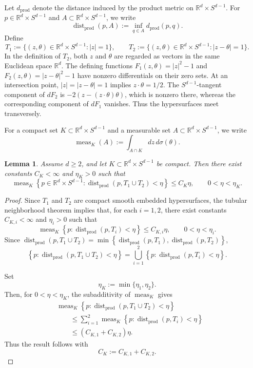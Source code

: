 \documentclass[11pt]{article}
\newtheorem{lemma}[theorem]{Lemma}
\theoremstyle{remark}
\numberwithin{equation}{section}
\begin{document}
Let $d_{\mathrm{prod}}$ denote the distance induced by the product metric on $\mathbb R^d\times S^{d-1}$. For $p\in\mathbb R^d\times S^{d-1}$ and $A\subset\mathbb R^d\times S^{d-1}$, we write 
\[ \operatorname{dist}_{\mathrm{prod}}(p,A) := \inf_{q\in A}d_{\mathrm{prod}}(p,q). \]
Define
\[ T_1 := \{(z,\theta)\in\mathbb R^d\times S^{d-1}:|z|=1\}, \qquad T_2 := \{(z,\theta)\in\mathbb R^d\times S^{d-1}:|z-\theta|=1\}. \]
In the definition of $T_2$, both $z$ and $\theta$ are regarded
as vectors in the same Euclidean space $\mathbb R^d$.
The defining functions
$F_1(z,\theta)=|z|^2-1$ and
$F_2(z,\theta)=|z-\theta|^2-1$ have nonzero differentials on their zero
sets.  
At an intersection point, $|z|=|z-\theta|=1$ implies $z\cdot\theta=1/2$. 
The $S^{d-1}$-tangent component of $dF_2$ is $-2(z-(z\cdot\theta)\theta)$, which is nonzero there, whereas the corresponding component of $dF_1$ vanishes. 
Thus the hypersurfaces meet transversely. 

For a compact set
$K\subset\mathbb R^d\times S^{d-1}$ and a measurable set
$A\subset\mathbb R^d\times S^{d-1}$, we write
\[
\operatorname{meas}_K(A)
:=
\int_{A\cap K} dz\,d\sigma(\theta).
\]

\begin{lemma}
\label{lem:fixed-trace-tubular}
Assume $d\ge2$, and let
$K\subset\mathbb R^d\times S^{d-1}$ be compact.
Then there exist constants $C_K<\infty$ and $\eta_K>0$ such that
\[
\operatorname{meas}_K
\left\{
p\in\mathbb R^d\times S^{d-1}:
\operatorname{dist}_{\mathrm{prod}}(p,T_1\cup T_2)<\eta
\right\}
\le C_K\eta,
\qquad
0<\eta<\eta_K.
\]
\end{lemma}

\begin{proof}
Since $T_1$ and $T_2$ are compact smooth embedded hypersurfaces,
the tubular neighborhood theorem implies that, for each $i=1,2$,
there exist constants $C_{K,i}<\infty$ and $\eta_i>0$ such that
\[
\operatorname{meas}_K
\left\{
p:
\operatorname{dist}_{\mathrm{prod}}(p,T_i)<\eta
\right\}
\le C_{K,i}\eta,
\qquad
0<\eta<\eta_i.
\]
Since
$\operatorname{dist}_{\mathrm{prod}}(p,T_1\cup T_2)
=
\min\left\{
\operatorname{dist}_{\mathrm{prod}}(p,T_1),
\operatorname{dist}_{\mathrm{prod}}(p,T_2)
\right\}$,
\[
\left\{
p:
\operatorname{dist}_{\mathrm{prod}}(p,T_1\cup T_2)<\eta
\right\}
=
\bigcup_{i=1}^2
\left\{
p:
\operatorname{dist}_{\mathrm{prod}}(p,T_i)<\eta
\right\}.
\]

Set
\[
\eta_K:=\min\{\eta_1,\eta_2\}.
\]
Then, for $0<\eta<\eta_K$, the subadditivity of
$\operatorname{meas}_K$ gives
\[
\begin{aligned}
&\operatorname{meas}_K
\left\{
p:
\operatorname{dist}_{\mathrm{prod}}(p,T_1\cup T_2)<\eta
\right\}\\
&\qquad\le
\sum_{i=1}^2
\operatorname{meas}_K
\left\{
p:
\operatorname{dist}_{\mathrm{prod}}(p,T_i)<\eta
\right\}\\
&\qquad\le
(C_{K,1}+C_{K,2})\eta.
\end{aligned}
\]
Thus the result follows with
\[
C_K:=C_{K,1}+C_{K,2}.
\]
\end{proof}
\end{document}

